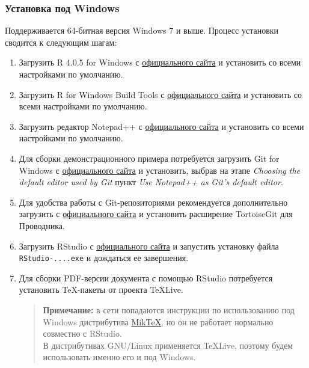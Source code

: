 \documentclass[
  a4paper,
]{book}
\theoremstyle{definition}
\theoremstyle{definition}
\theoremstyle{definition}
\theoremstyle{definition}
\theoremstyle{remark}
\begin{document}
\subsubsection{Установка под Windows}\label{software-r-windows}

Поддерживается 64-битная версия Windows 7 и выше. Процесс установки сводится к следующим шагам:

\begin{enumerate}
\def\labelenumi{\arabic{enumi}.}
\item
  Загрузить R 4.0.5 for Windows с \href{https://cran.r-project.org/bin/windows/base/old/4.0.5/R-4.0.5-win.exe}{официального сайта} и установить со всеми настройками по умолчанию.
\item
  Загрузить R for Windows Build Tools с \href{https://cran.r-project.org/bin/windows/Rtools/rtools40-x86_64.exe}{официального сайта} и установить со всеми настройками по умолчанию.
\item
  Загрузить редактор Notepad++ с \href{https://notepad-plus-plus.org/download/}{официального сайта} и установить со всеми настройками по умолчанию.
\item
  Для сборки демонстрационного примера потребуется загрузить Git for Windows с \href{https://git-scm.com/download/win}{официального сайта} и установить, выбрав на этапе \emph{Choosing the default editor used by Git} пункт \emph{Use Notepad++ as Git's default editor}.
\item
  Для удобства работы с Git-репозиториями рекомендуется дополнительно загрузить с \href{https://tortoisegit.org/download/}{официального сайта} и установить расширение TortoiseGit для Проводника.
\item
  Загрузить RStudio с \href{https://www.rstudio.com/products/rstudio/download/\#download}{официального сайта} и запустить установку файла \texttt{RStudio-....exe} и дождаться ее завершения.
\item
  Для сборки PDF-версии документа с помощью RStudio потребуется установить TeX-пакеты от проекта TeXLive.

  \begin{quote}
  \textbf{Примечание:} в сети попадаются инструкции по использованию под Windows дистрибутива \href{https://miktex.org/howto/install-miktex}{MikTeX}, но он не работает нормально совместно с RStudio.\\
  В дистрибутивах GNU/Linux применяется TeXLive, поэтому будем использовать именно его и под Windows.
  \end{quote}


\end{enumerate}
\end{document}
